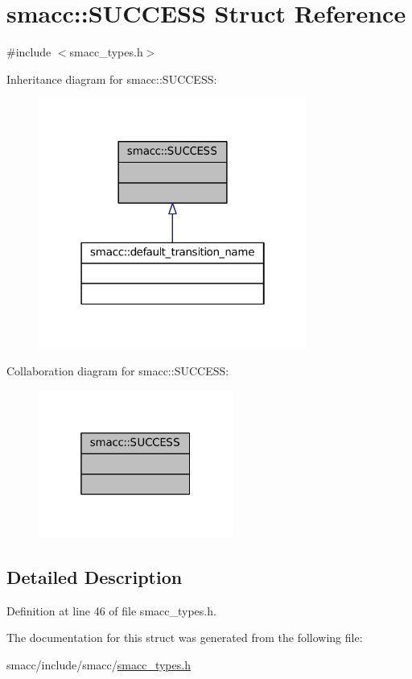 \hypertarget{structsmacc_1_1SUCCESS}{}\section{smacc\+:\+:S\+U\+C\+C\+E\+SS Struct Reference}
\label{structsmacc_1_1SUCCESS}


{\ttfamily \#include $<$smacc\+\_\+types.\+h$>$}



Inheritance diagram for smacc\+:\+:S\+U\+C\+C\+E\+SS\+:
\nopagebreak
\begin{figure}[H]
\begin{center}
\leavevmode
\includegraphics[width=250pt]{structsmacc_1_1SUCCESS__inherit__graph}
\end{center}
\end{figure}


Collaboration diagram for smacc\+:\+:S\+U\+C\+C\+E\+SS\+:
\nopagebreak
\begin{figure}[H]
\begin{center}
\leavevmode
\includegraphics[width=181pt]{structsmacc_1_1SUCCESS__coll__graph}
\end{center}
\end{figure}


\subsection{Detailed Description}


Definition at line 46 of file smacc\+\_\+types.\+h.



The documentation for this struct was generated from the following file\+:\begin{DoxyCompactItemize}
\item 
smacc/include/smacc/\hyperlink{smacc__types_8h}{smacc\+\_\+types.\+h}\end{DoxyCompactItemize}
